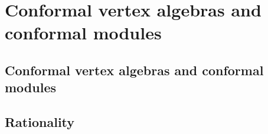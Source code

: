 \section{Conformal vertex algebras and conformal modules}
    \subsection{Conformal vertex algebras and conformal modules}

    \subsection{Rationality}